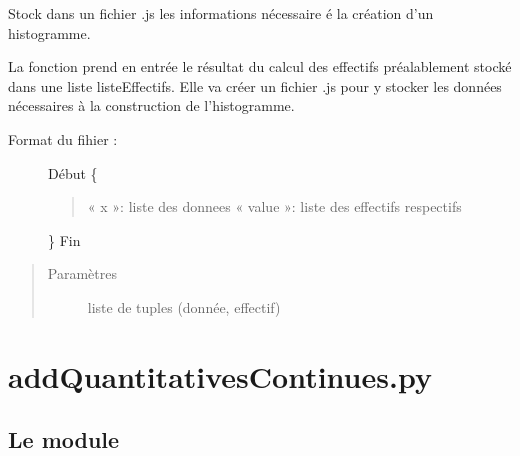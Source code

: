 \documentclass[letterpaper,10pt,openany,oneside,french]{sphinxmanual}
\begin{document}
\begin{fulllineitems}
\label{\detokenize{addQualitatives:add.addQualitatives.infoHistogramme}}
Stock dans un fichier .js les informations nécessaire é la création d’un histogramme.

La fonction prend en entrée le résultat du calcul des effectifs préalablement stocké dans une liste listeEffectifs. Elle 
va créer un fichier .js pour y stocker les données nécessaires à la construction de l’histogramme.
\begin{description}
\item[{Format du fihier :}] \leavevmode
Début
\{
\begin{quote}

« x »: liste des donnees
« value »: liste des effectifs respectifs
\end{quote}

\}
Fin

\end{description}
\begin{quote}\begin{description}
\item[{Paramètres}] \leavevmode
{} \textendash{} liste de tuples (donnée, effectif)

\end{description}\end{quote}

\end{fulllineitems}



\chapter{addQuantitativesContinues.py}
\label{\detokenize{addQuantitativesContinues::doc}}\label{\detokenize{addQuantitativesContinues:addquantitativescontinues-py}}\label{\detokenize{addQuantitativesContinues:module-add.addQuantitativesContinues}}

\section{Le module }
\label{\detokenize{addQuantitativesContinues:le-module-analyse-de-donnees-quantitatives-continues}}
\end{document}
